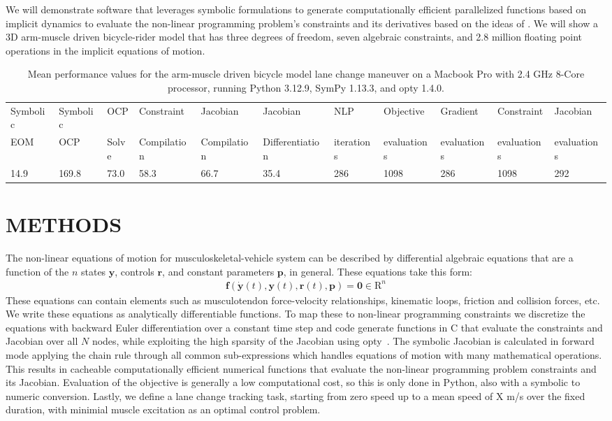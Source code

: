 \documentclass[11pt,twocolumn]{article}
\begin{document}
We will demonstrate software that leverages symbolic formulations to generate
computationally efficient parallelized functions based on implicit dynamics to
evaluate the non-linear programming problem's constraints and its derivatives
based on the ideas of \cite{vandenBogert2011a}. We will show a 3D arm-muscle
driven bicycle-rider model that has three degrees of freedom, seven algebraic
constraints, and 2.8 million floating point operations in the implicit equations
of motion.
%
\begin{table}[t]
  \centering
  \caption{Mean performance values for the arm-muscle driven bicycle model lane
  change maneuver on a Macbook Pro with 2.4 GHz 8-Core processor, running Python
  3.12.9, SymPy 1.13.3, and opty 1.4.0.}
  \scriptsize
  \begin{tabular}{lllllllllll}
    Symbolic & Symbolic & OCP & Constraint & Jacobian  & Jacobian & NLP & Objective &  Gradient & Constraint & Jacobian \\
    EOM & OCP & Solve & Compilation &  Compilation & Differentiation & iterations & evaluations & evaluations & evaluations & evaluations \\
    14.9 & 169.8 & 73.0 & 58.3 & 66.7 & 35.4 & 286 & 1098 & 286 & 1098 & 292
  \end{tabular}
  \label{tab:performance}
\end{table}

\section*{METHODS}
%
The non-linear equations of motion for musculoskeletal-vehicle system can be
described by differential algebraic equations that are a function of the \(n\)
states \(\mathbf{y}\), controls \(\mathbf{r}\), and constant parameters
\(\mathbf{p}\), in general. These equations take this form:
%
\begin{align}
  \mathbf{f}(\dot{\mathbf{y}}(t), \mathbf{y}(t), \mathbf{r}(t), \mathbf{p}) =
  \mathbf{0} \in \mathrm{R}^n
\end{align}
%
These equations can contain elements such as musculotendon force-velocity
relationships, kinematic loops, friction and collision forces, etc. We write
these equations as analytically differentiable functions. To map these to
non-linear programming constraints we discretize the equations with backward
Euler differentiation over a constant time step and code generate functions in C
that evaluate the constraints and Jacobian over all \(N\) nodes, while
exploiting the high sparsity of the Jacobian using opty~\cite{Moore2018}. The
symbolic Jacobian is calculated in forward mode applying the chain rule through
all common sub-expressions which handles equations of motion with many
mathematical operations. This results in cacheable computationally efficient
numerical functions that evaluate the non-linear programming problem constraints
and its Jacobian. Evaluation of the objective is generally a low computational
cost, so this is only done in Python, also with a symbolic to numeric
conversion. Lastly, we define a lane change tracking task, starting from zero
speed up to a mean speed of X m/s over the fixed duration, with minimial muscle
excitation as an optimal control problem.
\end{document}
